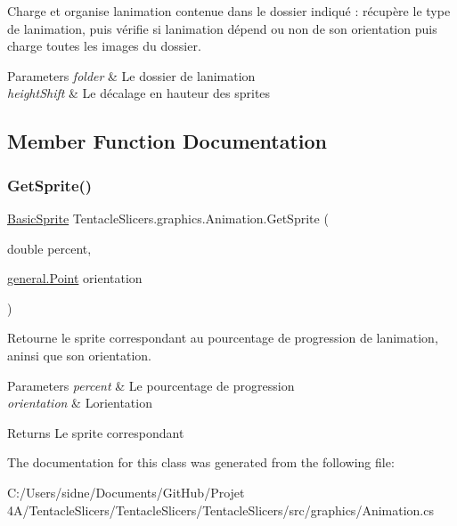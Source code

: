 Charge et organise l\textquotesingle{}animation contenue dans le dossier indiqué \+: récupère le type de l\textquotesingle{}animation, puis vérifie si l\textquotesingle{}animation dépend ou non de son orientation puis charge toutes les images du dossier. 


\begin{DoxyParams}{Parameters}
{\em folder} & Le dossier de l\textquotesingle{}animation \\
\hline
{\em height\+Shift} & Le décalage en hauteur des sprites \\
\hline
\end{DoxyParams}


\subsection{Member Function Documentation}
\mbox{\label{class_tentacle_slicers_1_1graphics_1_1_animation_a9575afe2c888a8b4edcf44bca95ac934}} 
\subsubsection{\texorpdfstring{Get\+Sprite()}{GetSprite()}}
{\footnotesize\ttfamily \hyperlink{class_tentacle_slicers_1_1graphics_1_1_basic_sprite}{Basic\+Sprite} Tentacle\+Slicers.\+graphics.\+Animation.\+Get\+Sprite (\begin{DoxyParamCaption}\item[{double}]{percent,  }\item[{\hyperlink{class_tentacle_slicers_1_1general_1_1_point}{general.\+Point}}]{orientation }\end{DoxyParamCaption})}



Retourne le sprite correspondant au pourcentage de progression de l\textquotesingle{}animation, aninsi que son orientation. 


\begin{DoxyParams}{Parameters}
{\em percent} & Le pourcentage de progression \\
\hline
{\em orientation} & L\textquotesingle{}orientation \\
\hline
\end{DoxyParams}
\begin{DoxyReturn}{Returns}
Le sprite correspondant 
\end{DoxyReturn}


The documentation for this class was generated from the following file\+:\begin{DoxyCompactItemize}
\item 
C\+:/\+Users/sidne/\+Documents/\+Git\+Hub/\+Projet 4\+A/\+Tentacle\+Slicers/\+Tentacle\+Slicers/\+Tentacle\+Slicers/src/graphics/Animation.\+cs\end{DoxyCompactItemize}
